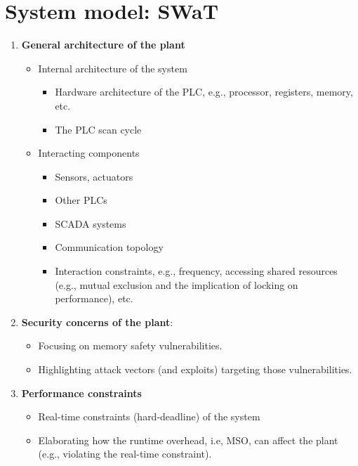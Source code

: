\documentclass{acm_proc_article-sp}
\begin{document}
\section{System model: SWaT}\label{systemmodel}
\begin{enumerate}
\item \textbf{General architecture of the plant}
\begin{itemize}
\item Internal architecture of the system 
\begin{itemize}
\item Hardware architecture of the PLC, e.g., processor, registers, memory, etc.
\item The PLC scan cycle 
\end{itemize}
\item Interacting components
\begin{itemize}
\item Sensors, actuators
\item Other PLCs
\item SCADA systems
\item Communication topology
\item Interaction constraints, e.g., frequency, accessing shared resources (e.g., mutual exclusion and the implication of locking on performance), etc.
\end{itemize}
\end{itemize}
\item \textbf{Security concerns of the plant}: 
\begin{itemize}
\item Focusing on memory safety vulnerabilities.
\item Highlighting attack vectors (and exploits) targeting those vulnerabilities. 
\end{itemize}
\item \textbf{Performance constraints}
\begin{itemize}
\item Real-time constraints (hard-deadline) of the system
\item Elaborating how the runtime overhead, i.e, MSO, can affect the plant (e.g., violating the real-time constraint). 
\end{itemize}
\end{enumerate}
\end{document}
